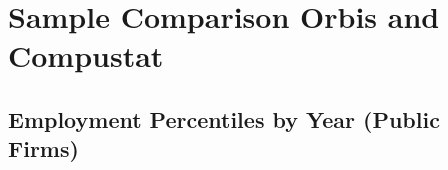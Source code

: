 \documentclass[12pt,notitlepage]{article}
\begin{document}
%         

%         

%         

%         



\FloatBarrier
\section{Sample Comparison Orbis and Compustat} %
\label{sec:compustat_vs_orbis}
\FloatBarrier

\subsection{Employment Percentiles by Year (Public Firms)}
\end{document}
